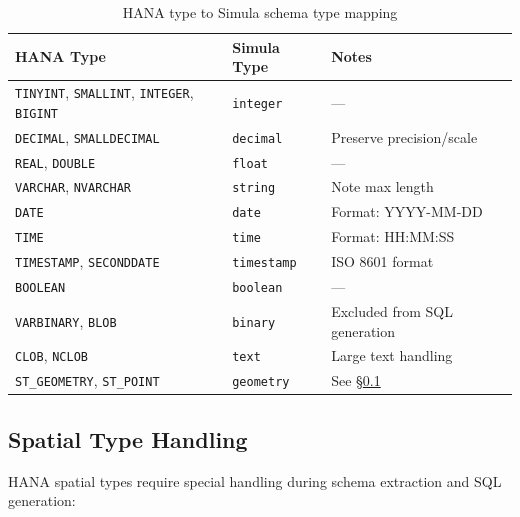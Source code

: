 \documentclass[12pt,a4paper,twoside]{report}
\begin{document}
\begin{table}[H]
\centering
\caption{HANA type to Simula schema type mapping}
\label{tab:hana-type-mapping}
\footnotesize
\begin{tabularx}{\textwidth}{@{}l l X@{}}
\toprule
\textbf{HANA Type} & \textbf{Simula Type} & \textbf{Notes} \\
\midrule
\texttt{TINYINT}, \texttt{SMALLINT}, \texttt{INTEGER}, \texttt{BIGINT} & \texttt{integer} & --- \\
\texttt{DECIMAL}, \texttt{SMALLDECIMAL} & \texttt{decimal} & Preserve precision/scale \\
\texttt{REAL}, \texttt{DOUBLE} & \texttt{float} & --- \\
\texttt{VARCHAR}, \texttt{NVARCHAR} & \texttt{string} & Note max length \\
\texttt{DATE} & \texttt{date} & Format: YYYY-MM-DD \\
\texttt{TIME} & \texttt{time} & Format: HH:MM:SS \\
\texttt{TIMESTAMP}, \texttt{SECONDDATE} & \texttt{timestamp} & ISO 8601 format \\
\texttt{BOOLEAN} & \texttt{boolean} & --- \\
\texttt{VARBINARY}, \texttt{BLOB} & \texttt{binary} & Excluded from SQL generation \\
\texttt{CLOB}, \texttt{NCLOB} & \texttt{text} & Large text handling \\
\texttt{ST\_GEOMETRY}, \texttt{ST\_POINT} & \texttt{geometry} & See \S\ref{sec:spatial-types} \\
\bottomrule
\end{tabularx}
\end{table}

\subsection{Spatial Type Handling}
\label{sec:spatial-types}

HANA spatial types require special handling during schema extraction and SQL
generation:
\end{document}
